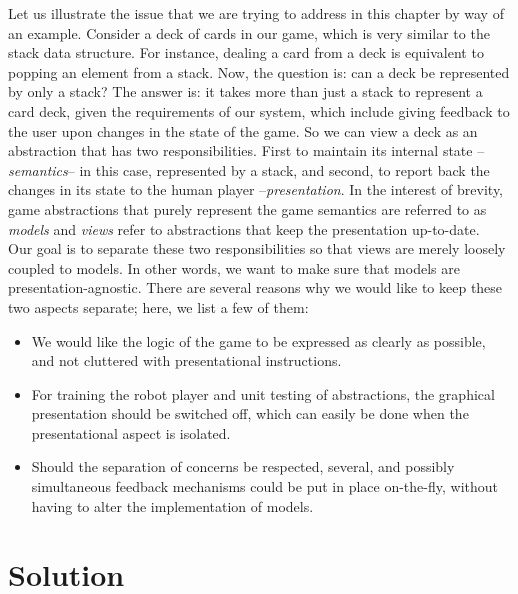 \documentclass[10pt,oneside,a4paper]{skh-scrreprt}
\begin{document}
Let us illustrate the
issue that we are trying to
address in this chapter 
by way of an example.
Consider a deck of cards
in our game, which is very
similar to the stack
data structure.
For instance, dealing a 
card from a deck
is equivalent to popping
an element from a stack.
Now, the question is:
can a deck be represented
by only a stack?
The answer is:
it takes more than just
a stack to represent
a card deck, given
the requirements of our system,
which include giving feedback
to the user upon changes
in the state of the game.
So we can view a deck as an abstraction
that has two responsibilities.
First to maintain its
internal state --\emph{semantics}--
in this case, represented by a stack,
and second, to report 
back the changes in its state
to the human player 
--\emph{presentation}.
In the interest of brevity,
game abstractions that purely
represent the game semantics
are referred to
as \emph{models} and \emph{views}
refer to abstractions
that keep the presentation
up-to-date.
\\

Our goal is to separate these
two responsibilities so that 
views are merely loosely coupled
to models.
In other words, we want
to make sure that models
are presentation-agnostic.
There are several reasons
why we would like to keep
these two aspects separate;
here, we list a few of them:

\begin{itemize}
\item
  We would like the logic of the game
  to be expressed as clearly as possible, 
  and not cluttered with presentational 
  instructions.
\item
  For training the robot player
  and unit testing of abstractions,
  the graphical presentation 
  should be switched off, which can
  easily be done when the presentational
  aspect is isolated.
\item
  Should the separation
  of concerns be respected,
  several, and possibly simultaneous
  feedback mechanisms could
  be put in place on-the-fly,
  without having to alter
  the implementation of models.
\end{itemize}

\section{Solution}\label{sec:soc-solution}

\def \cardlist{\texttt{CardList}}
\def \deck{\texttt{Deck}}
\def \model{\texttt{Model}}
\def \view{\texttt{View}}
\def \region{\texttt{Region}}
\def \observer{\texttt{Observer}}
\def \notify{\texttt{notify}}
\def \update{\texttt{update}}
\def \subviews{\texttt{subviews}}
\end{document}
